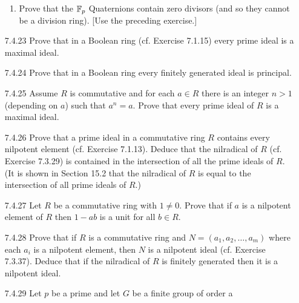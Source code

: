 \begin{enumerate}
\begin{enumerate}
                     \item Prove that the $\mathbb{F}_p$ Quaternions contain zero
                           divisors (and so they cannot be a division ring).
                           [Use the preceding exercise.]
                  \end{enumerate}
   \item[7.4.23]  Prove that in a Boolean ring (cf. Exercise 7.1.15) every prime
                  ideal is a maximal ideal.
   \item[7.4.24]  Prove that in a Boolean ring every finitely generated ideal is
                  principal.
   \item[7.4.25]  Assume $R$ is commutative and for each $a \in R$ there is an
                  integer $n > 1$ (depending on $a$) such that $a^n = a$. Prove
                  that every prime ideal of $R$ is a maximal ideal.
   \item[7.4.26]  Prove that a prime ideal in a commutative ring $R$ contains
                  every nilpotent element (cf. Exercise 7.1.13). Deduce that the
                  nilradical of $R$ (cf. Exercise 7.3.29) is contained in the
                  intersection of all the prime ideals of $R$. (It is shown in
                  Section 15.2 that the nilradical of $R$ is equal to the
                  intersection of all prime ideals of $R$.)
   \item[7.4.27]  Let $R$ be a commutative ring with $1 \neq 0$. Prove that if
                  $a$ is a nilpotent element of $R$ then $1 - ab$ is a unit for
                  all $b \in R$.
   \item[7.4.28]  Prove that if $R$ is a commutative ring and
                  $N = (a_1, a_2, \ldots, a_m)$ where each $a_i$ is a nilpotent
                  element, then $N$ is a nilpotent ideal (cf. Exercise 7.3.37).
                  Deduce that if the nilradical of $R$ is finitely generated
                  then it is a nilpotent ideal.
   \item[7.4.29]  Let $p$ be a prime and let $G$ be a finite group of order a

\end{enumerate}

